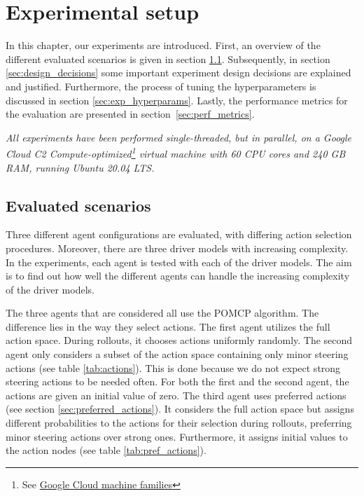 \chapter{Experimental setup}
\label{ch:setup}

In this chapter, our experiments are introduced. First, an overview of the different evaluated scenarios is given in section \ref{sec:scenarios}. Subsequently, in section \ref{sec:design_decisions} some important experiment design decisions are explained and justified. Furthermore, the process of tuning the hyperparameters is discussed in section \ref{sec:exp_hyperparams}. Lastly, the performance metrics for the evaluation are presented in section~\ref{sec:perf_metrics}.

\emph{All experiments have been performed single-threaded, but in parallel, on a Google Cloud C2 Compute-optimized\footnote{See \href{https://cloud.google.com/compute/docs/machine-types}{Google Cloud machine families}} virtual machine with 60 CPU cores and 240 GB RAM, running Ubuntu 20.04 LTS.}

\section{Evaluated scenarios}
\label{sec:scenarios}

Three different agent configurations are evaluated, with differing action selection procedures. Moreover, there are three driver models with increasing complexity. In the experiments, each agent is tested with each of the driver models. The aim is to find out how well the different agents can handle the increasing complexity of the driver models.

The three agents that are considered all use the POMCP algorithm. The difference lies in the way they select actions. The first agent utilizes the full action space. During rollouts, it chooses actions uniformly randomly. The second agent only considers a subset of the action space containing only minor steering actions (see table \ref{tab:actions}). This is done because we do not expect strong steering actions to be needed often. For both the first and the second agent, the actions are given an initial value of zero. The third agent uses preferred actions (see section \ref{sec:preferred_actions}). It considers the full action space but assigns different probabilities to the actions for their selection during rollouts, preferring minor steering actions over strong ones. Furthermore, it assigns initial values to the action nodes (see table \ref{tab:pref_actions}).

